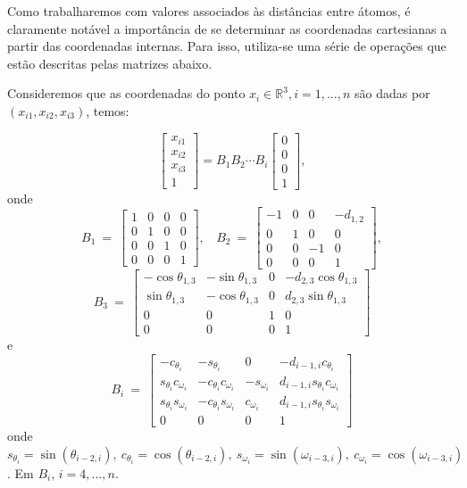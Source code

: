 \documentclass[a4paper,12pt]{article}
\begin{document}
	Como trabalharemos com valores associados às distâncias entre átomos, é claramente notável a importância de se determinar as coordenadas cartesianas a partir das coordenadas internas. Para isso, utiliza-se uma série de operações que estão descritas pelas matrizes abaixo.
	
	Consideremos que as coordenadas do ponto $x_{i} \in\mathbb{R}^3,i= 1, ...,n $ são dadas por $(x_{i1},x_{i2},x_{i3})$, temos:
	
	$$
	\begin{bmatrix}
	x_{i1}\\ 
	x_{i2}\\ 
	x_{i3}\\ 
	1
	\end{bmatrix}
	= B_{1}B_{2}\cdots B_{i}\begin{bmatrix}
	0\\ 
	0\\ 
	0\\ 
	1
	\end{bmatrix},
	$$
	onde
	$$
	B_1\: =\:
	\begin{bmatrix}
	1 & 0 & 0 & 0\\ 
	0 & 1 & 0 & 0\\ 
	0 & 0 & 1 & 0\\ 
	0 & 0 & 0 & 1
	\end{bmatrix},\:\:\:
	\: B_2\: =\:
	\begin{bmatrix}
	-1 & 0 & 0 & -d_{1,2}\\
	0 & 1 & 0 & 0\\ 
	0 & 0 & -1 & 0\\ 
	0 & 0 & 0 & 1
	\end{bmatrix},
	$$
	$$
	B_3\:=\:
	\begin{bmatrix}
	-\cos\theta_{1,3} & -\sin\theta_{1,3} & 0 & -d_{2,3}\cos\theta_{1,3}\\ 
	\sin\theta_{1,3} & -\cos\theta_{1,3} & 0 & d_{2,3}\sin\theta_{1,3}\\ 
	0 & 0 & 1 & 0\\ 
	0 & 0 & 0 & 1
	\end{bmatrix}
	$$
	e
	$$
	B_i\:=\:
	\begin{bmatrix}
	-c_{\theta_{i}} & -s_{\theta_{i}} & 0 & -d_{i-1,i}c_{\theta_{i}}\\ 
	s_{\theta_{i}}c_{\omega_{i}} & -c_{\theta_{i}}c_{\omega_{i}}
	& -s_{\omega_{i}} & d_{i-1,i}s_{\theta_{i}}c_{\omega_{i}}\\ 
	s_{\theta_{i}}s_{\omega_{i}} & -c_{\theta_{i}}s_{\omega_{i}} & c_{\omega_{i}} & d_{i-1,i}s_{\theta_{i}}s_{\omega_{i}}\\ 
	0 & 0 & 0 & 1
	\end{bmatrix}
	$$
	onde $s_{\theta_{i}}=\sin (\theta_{i-2, i}),\: c_{\theta_{i}}=\cos (\theta_{i-2, i}),\: s_{\omega_{i}}=\sin (\omega_{i-3, i}),\: c_{\omega_{i}}=\cos (\omega_{i-3, i})$. Em $B_i$, $i=4, ..., n$.
	
\end{document}
